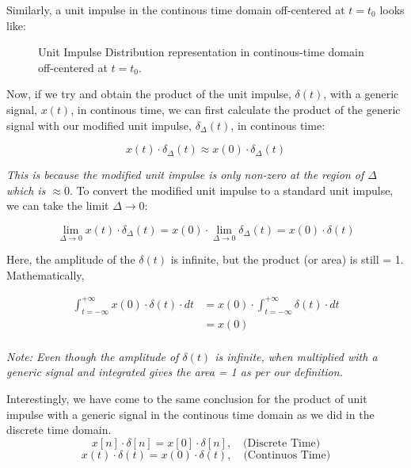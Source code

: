 \documentclass[letterpaper,12pt]{article}
\begin{document}
Similarly, a unit impulse in the continous time domain off-centered at
$t=t_{0}$ looks like:

\begin{figure}[!ht]
    \centering
    
    \caption{Unit Impulse Distribution representation in continous-time domain off-centered at $t=t_{0}$.}\label{fig:unit_impulse_cont_off_centered}
\end{figure}

Now, if we try and obtain the product of the unit impulse, $\delta(t)$, with a
generic signal, $x(t)$, in continous time, we can first calculate the product
of the generic signal with our modified unit impulse, $\delta_{\Delta}(t)$, in
continous time:

\[x(t)\cdot \delta_{\Delta}(t) \approx x(0)\cdot \delta_{\Delta}(t)\]

\textit{This is because the modified unit impulse is only non-zero at the region of $\Delta$ which is $\approx 0$}. To convert the modified unit impulse to a standard unit impulse, we can take the limit $\Delta \to 0$:

\[\lim_{\Delta \to 0} x(t) \cdot \delta_{\Delta}(t) = x(0) \cdot \lim_{\Delta \to 0} \delta_{\Delta}(t) = x(0) \cdot \delta(t)\]

Here, the amplitude of the $\delta(t)$ is infinite, but the product (or area)
is still = 1. Mathematically,

\begin{equation*}
    \begin{aligned}
        \int_{t=-\infty}^{+\infty} x(0) \cdot \delta(t) \cdot dt & = x(0) \cdot \int_{t=-\infty}^{+\infty} \delta(t) \cdot dt \\
                                                                 & = x(0)                                                     \\
    \end{aligned}
\end{equation*}

\textit{Note: Even though the amplitude of $\delta(t)$ is infinite, when multiplied with a generic signal and integrated gives the area = 1 as per our definition.}

\vspace{0.5cm}
Interestingly, we have come to the same conclusion for the product of unit impulse with a generic signal in the continous time domain as we did in the discrete time domain.
\[x[n] \cdot \delta[n] = x[0] \cdot \delta[n], \quad \text{(Discrete Time)}\]
\[x(t) \cdot \delta(t) = x(0) \cdot \delta(t), \quad \text{(Continuos Time)}\]
\end{document}
